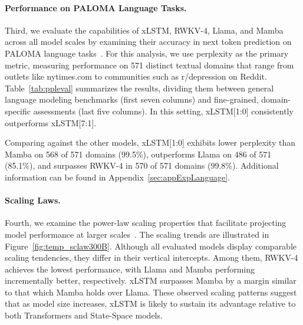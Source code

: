 \paragraph{Performance on PALOMA Language Tasks.} Third, we evaluate the capabilities of xLSTM, RWKV-4, Llama, and Mamba across all model scales by examining their accuracy in next token prediction on PALOMA language tasks~\citep{Magnusson:23arxivshort}. For this analysis, we use perplexity as the primary metric, measuring performance on 571 distinct textual domains that range from outlets like nytimes.com to communities such as r/depression on Reddit. Table~\ref{tab:ppleval} summarizes the results, dividing them between general language modeling benchmarks (first seven columns) and fine-grained, domain-specific assessments (last five columns). In this setting, xLSTM[1:0] consistently outperforms xLSTM[7:1].

Comparing against the other models, xLSTM[1:0] exhibits lower perplexity than Mamba on 568 of 571 domains (99.5\%), outperforms Llama on 486 of 571 (85.1\%), and surpasses RWKV-4 in 570 of 571 domains (99.8\%). Additional information can be found in Appendix~\ref{sec:appExpLanguage}.

\paragraph{Scaling Laws.} Fourth, we examine the power-law scaling properties that facilitate projecting model performance at larger scales~\citep{Kaplan:20,Brown:20short}. The scaling trends are illustrated in Figure~\ref{fig:temp_sclaw300B}. Although all evaluated models display comparable scaling tendencies, they differ in their vertical intercepts. Among them, RWKV-4 achieves the lowest performance, with Llama and Mamba performing incrementally better, respectively. xLSTM surpasses Mamba by a margin similar to that which Mamba holds over Llama. These observed scaling patterns suggest that as model size increases, xLSTM is likely to sustain its advantage relative to both Transformers and State-Space models.

